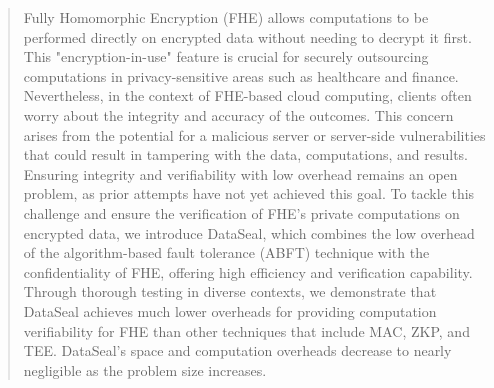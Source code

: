 \documentclass[conference,compsoc]{IEEEtran}
\begin{document}

\author{
{}
}


\maketitle

\def\thefootnote{$*$}
\begin{abstract}
Fully Homomorphic Encryption (FHE) allows computations to be performed directly on encrypted data without needing to decrypt it first. This "encryption-in-use" feature is crucial for securely outsourcing computations in privacy-sensitive areas such as healthcare and finance. Nevertheless, in the context of FHE-based cloud computing, clients often worry about the integrity and accuracy of the outcomes. This concern arises from the potential for a malicious server or server-side vulnerabilities that could result in tampering with the data, computations, and results.  Ensuring integrity and verifiability with low overhead remains an open problem, as prior attempts have not yet achieved this goal. To tackle this challenge and ensure the verification of FHE's private computations on encrypted data, we introduce DataSeal, which combines the low overhead of the algorithm-based fault tolerance (ABFT) technique with the confidentiality of FHE, offering high efficiency and verification capability.  Through thorough testing in diverse contexts,  we demonstrate that DataSeal achieves much lower overheads for providing computation verifiability for FHE than other techniques that include MAC, ZKP, and TEE. DataSeal's space and computation overheads decrease to nearly negligible as the problem size increases.  

\end{abstract}
\end{document}
